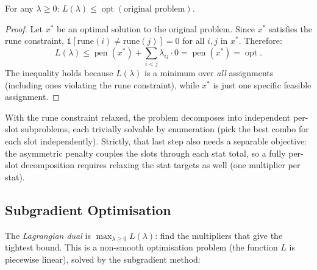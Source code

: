 \documentclass[11pt, a4paper, oneside]{book}
\newcommand{\pen}{\operatorname{pen}}
\newcommand{\opt}{\operatorname{opt}}
\begin{document}
\begin{thmbox}[title={Weak Lagrangian Duality}]
For any $\lambda \geq 0$: $L(\lambda) \leq \opt(\text{original problem})$.
\end{thmbox}

\begin{proof}
Let $x^*$ be an optimal solution to the original problem.  Since $x^*$
satisfies the rune constraint, $\mathbb{1}[\text{rune}(i) \neq
\text{rune}(j)] = 0$ for all $i, j$ in $x^*$.  Therefore:
\[
  L(\lambda) \leq \pen(x^*) + \sum_{i < j} \lambda_{ij} \cdot 0
  = \pen(x^*) = \opt.
\]
The inequality holds because $L(\lambda)$ is a minimum over \emph{all}
assignments (including ones violating the rune constraint), while $x^*$
is just one specific feasible assignment.
\end{proof}

With the rune constraint relaxed, the problem decomposes into independent
per-slot subproblems, each trivially solvable by enumeration (pick the
best combo for each slot independently).  Strictly, that last step also needs a
separable objective: the asymmetric penalty couples the slots through each stat
total, so a fully per-slot decomposition requires relaxing the stat targets as
well (one multiplier per stat).

\subsection{Subgradient Optimisation}

The \emph{Lagrangian dual} is $\max_{\lambda \geq 0} L(\lambda)$: find the
multipliers that give the tightest bound.  This is a non-smooth optimisation
problem (the function $L$ is piecewise linear), solved by the subgradient
method:
\end{document}
